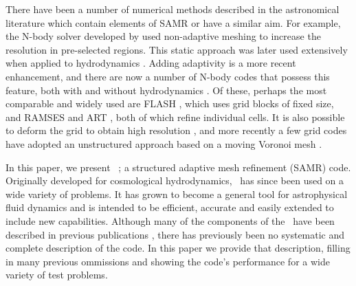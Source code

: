 There have been a number of numerical methods described in the astronomical literature which contain elements of SAMR or have a similar aim. For example, the N-body solver developed by \citet{Villumsen89} used non-adaptive meshing to increase the resolution in pre-selected regions. This static approach was later used extensively when applied to hydrodynamics \citep[e.g.,][]{Ruffert94, Anninos94}. Adding adaptivity is a more recent enhancement, and there are now a number of N-body codes that possess this feature, both with and without  hydrodynamics  \citep{Couchman91, Jessop94, Suisalu95, Splinter96, Gelato97, ART97, Truelove98, flash_method, MLAPM01,  Yahagi01, RAMSES, Quilis04, Ziegler05, Zhang06, Astrobear09, Pluto-amr, GAMER, Nyx}. Of these, perhaps the most comparable and widely used are FLASH \citep{flash_method}, which uses grid blocks of fixed size, and RAMSES \citep{RAMSES} and ART \citep{ART97}, both of which refine individual cells. It is also possible to deform the grid to obtain high resolution \citep[e.g.,][]{Gnedin95, Xu97, Pen98}, and more recently a few grid codes have adopted an unstructured approach based on a moving Voronoi mesh \citep{Arepo10, Tess11}.

In this paper, we present \enzo\ ; a structured adaptive mesh refinement (SAMR) code. Originally developed for cosmological hydrodynamics, \enzo\ has since been used on a wide variety of problems.  It has grown to become a general tool for astrophysical fluid dynamics and is intended to be efficient, accurate and easily extended to include new capabilities.  Although many of the components of the \enzo\ have been described in previous publications \citep{1995CoPhC..89..149B, BryanThesis96, Bryan97a, Bryan97b, Norman99, BryanCompSci99, Bryan01, Oshea04, 2007arXiv0705.1556N, WangAbelZhang08,ReynoldsHayesPaschosNorman2009,Collins10,Wise11_Moray}, there has previously been no systematic and complete description of the code.  In this paper we provide that description, filling in many previous ommissions and showing the code's performance for a wide variety of test problems.

